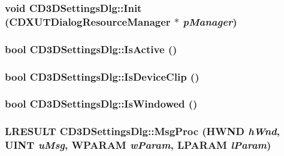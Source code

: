 \label{class_c_d3_d_settings_dlg_a3a9d268771e11c24188ad4be4185ede3}
\hypertarget{class_c_d3_d_settings_dlg_ad729e65b02d7da4db7672d29d0d7c935}{
\subsubsection[{Init}]{\setlength{\rightskip}{0pt plus 5cm}void CD3DSettingsDlg::Init ({\bf CDXUTDialogResourceManager} $\ast$ {\em pManager})}}
\label{class_c_d3_d_settings_dlg_ad729e65b02d7da4db7672d29d0d7c935}
\hypertarget{class_c_d3_d_settings_dlg_a1bf2d86e2af7d854ed904035e15677bd}{
\subsubsection[{IsActive}]{\setlength{\rightskip}{0pt plus 5cm}bool CD3DSettingsDlg::IsActive ()}}
\label{class_c_d3_d_settings_dlg_a1bf2d86e2af7d854ed904035e15677bd}
\hypertarget{class_c_d3_d_settings_dlg_ac5d2815eced3dcc37c0313ffd1e522ca}{
\subsubsection[{IsDeviceClip}]{\setlength{\rightskip}{0pt plus 5cm}bool CD3DSettingsDlg::IsDeviceClip ()}}
\label{class_c_d3_d_settings_dlg_ac5d2815eced3dcc37c0313ffd1e522ca}
\hypertarget{class_c_d3_d_settings_dlg_a3788a01ff4742e458ba3d117d2bfdde3}{
\subsubsection[{IsWindowed}]{\setlength{\rightskip}{0pt plus 5cm}bool CD3DSettingsDlg::IsWindowed ()}}
\label{class_c_d3_d_settings_dlg_a3788a01ff4742e458ba3d117d2bfdde3}
\hypertarget{class_c_d3_d_settings_dlg_a8a3ecd505c89b0bba30aabce63534a31}{
\subsubsection[{MsgProc}]{\setlength{\rightskip}{0pt plus 5cm}LRESULT CD3DSettingsDlg::MsgProc (HWND {\em hWnd}, \/  UINT {\em uMsg}, \/  WPARAM {\em wParam}, \/  LPARAM {\em lParam})}}
